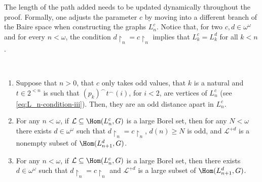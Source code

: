 \documentclass[12pt]{article}
\begin{document}
The length of the path added needs to be updated dynamically throughout the proof.
Formally, one adjusts the parameter $c$ by moving into a different branch of the Baire space when constructing the graphs $L^c_n$.
Notice that, for two $c,d\in\omega^\omega$ and for every $n<\omega$, the condition $d\restriction_n=c\restriction_n$ implies that $L^c_k=L^d_k$ for all $k<n$.

\begin{lemma}\label{lemma:Ln_basics}~ 
    \begin{enumerate}[label=(\alph*)]
        \item Suppose that $n>0$, that $c$ only takes odd values, that $k$ is a natural and $t\in2^{<n}$ is such that $(p_k)^\smallfrown t^\smallfrown(i)$, for $i<2$, are vertices of $L^c_n$ (see \eqref{eq:L_n-condition-iii}).
        Then, they are an odd distance apart in $L^c_n$.

        \item For any $n<\omega$, if $\mathcal L\subseteq\Hom(L^c_n,G)$ is a large Borel set, then for any $N<\omega$ there exists $d\in\omega^\omega$ such that $d\restriction_n=c\restriction_n$, $d(n)\geq N$ is odd, and $\mathcal L^{+d}$ is a nonempty subset of $\Hom(L^{d}_{n+1},G)$.

        \item For any $n<\omega$, if $\mathcal L\subseteq\Hom(L^c_n,G)$ is a large Borel set, then there exists $d\in\omega^\omega$ such that $d\restriction_n=c\restriction_n$ and $\mathcal L^{+d}$ is a large subset of $\Hom(L^{d}_{n+1},G)$.
    \end{enumerate}
\end{lemma}
\end{document}
